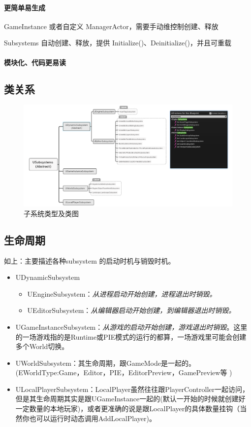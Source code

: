 \documentclass[UTF8,a4paper,12pt]{ctexbook}
\begin{document}
			\paragraph{更简单易生成}
				GameInstance 或者自定义 ManagerActor，需要手动维控制创建、释放
				
				Subsystems 自动创建、释放，提供 Initialize()、Deinitialize()，并且可重载
			
			\paragraph{模块化、代码更易读}
					
			
		\subsection{类关系}
			\begin{figure}[H]
				\centering
				\includegraphics[width=\linewidth]{subsystem}
				\caption{子系统类型及类图}
			\end{figure}
		
		\subsection{生命周期}
			如上：主要描述各种subsystem 的启动时机与销毁时机。
			\begin{itemize}
				\item UDynamicSubsystem
					\begin{itemize}
						\item UEngineSubsystem：\textit{从进程启动开始创建，进程退出时销毁。}
						\item UEditorSubsystem：\textit{从编辑器启动开始创建，到编辑器退出时销毁。}
					\end{itemize}
				\item UGameInstanceSubsystem：\textit{从游戏的启动开始创建，游戏退出时销毁}。这里的一场游戏指的是Runtime或PIE模式的运行的都算，一场游戏里可能会创建多个World切换。
				\item UWorldSubsystem：其生命周期，跟GameMode是一起的。(EWorldType:Game，Editor，PIE，EditorPreview，GamePreview等 )
				\item ULocalPlayerSubsystem：LocalPlayer虽然往往跟PlayerController一起访问，但是其生命周期其实是跟UGameInstance一起的(默认一开始的时候就创建好一定数量的本地玩家)，或者更准确的说是跟LocalPlayer的具体数量挂钩（当然你也可以运行时动态调用AddLocalPlayer)。
			\end{itemize}
		
\end{document}
